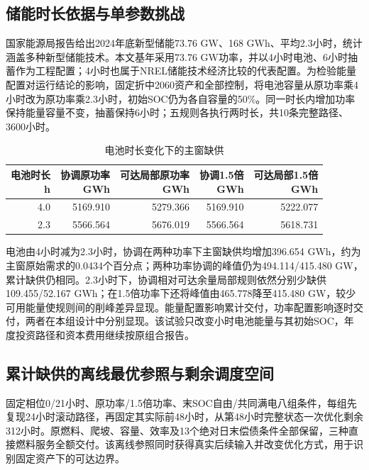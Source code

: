 \subsection{储能时长依据与单参数挑战}
国家能源局报告给出2024年底新型储能73.76 GW、168 GWh、平均2.3小时，统计涵盖多种新型储能技术\cite{nea_storage_2025}。本文基年采用73.76 GW功率，并以4小时电池、6小时抽蓄作为工程配置；4小时也属于NREL储能技术经济比较的代表配置\cite{nrel_atb_storage}。为检验能量配置对运行结论的影响，固定折中2060资产和全部控制，将电池容量从原功率乘4小时改为原功率乘2.3小时，初始SOC仍为各自容量的50\%。同一时长内增加功率保持能量容量不变，抽蓄保持6小时；五规则各执行两时长，共10条完整路径、3600小时。
\begin{table}[H]\centering\caption{电池时长变化下的主窗缺供}
\begin{tabular}{rrrrr}\toprule
\shortstack{电池时长\\h} & \shortstack{协调原功率\\GWh} & \shortstack{可达局部原功率\\GWh} & \shortstack{协调1.5倍\\GWh} & \shortstack{可达局部1.5倍\\GWh}\\\midrule
4.0 & 5169.910 & 5279.366 & 5169.910 & 5222.077 \\
2.3 & 5566.564 & 5676.019 & 5566.564 & 5618.731 \\
\bottomrule\end{tabular}
\end{table}

电池由4小时减为2.3小时，协调在两种功率下主窗缺供均增加396.654 GWh，约为主窗原始需求的0.0434个百分点；两种功率协调的峰值仍为494.114/415.480 GW，累计缺供仍相同。2.3小时下，协调相对可达余量局部规则依然分别少缺供109.455/52.167 GWh；在1.5倍功率下还将峰值由465.778降至415.480 GW，较少可用能量使规则间的削峰差异显现。能量配置影响累计交付，功率配置影响逐时交付，两者在本组设计中分别显现。该试验只改变小时电池能量与其初始SOC，年度投资路径和资本费用继续按原组合报告。

\subsection{累计缺供的离线最优参照与剩余调度空间}
固定相位0/21小时、原功率/1.5倍功率、末SOC自由/共同满电八组条件，每组先复现24小时滚动路径，再固定其实际前48小时，从第48小时完整状态一次优化剩余312小时。原燃料、爬坡、容量、效率及13个绝对日末偿债条件全部保留，三种直接燃料服务全额交付。该离线参照同时获得真实后续输入并改变优化方式，用于识别固定资产下的可达边界。

